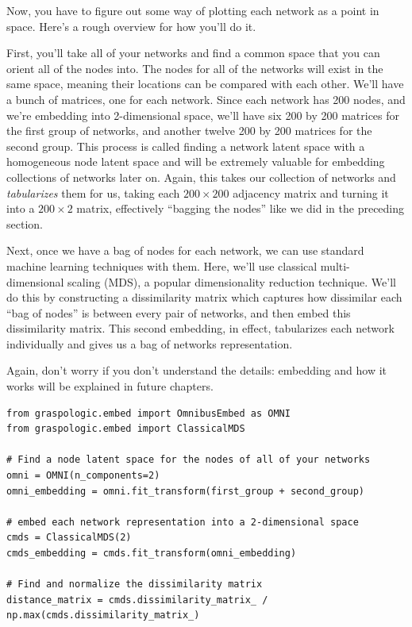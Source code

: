 Now, you have to figure out some way of plotting each network as a point in space. Here's a rough overview for how you'll do it.

First, you'll take all of your networks and find a common space that you can orient all of the nodes into. The nodes for all of the networks will exist in the same space, meaning their locations can be compared with each other. We'll have a bunch of matrices, one for each network. Since each network has 200 nodes, and we're embedding into 2-dimensional space, we'll have six 200 by 200 matrices for the first group of networks, and another twelve 200 by 200 matrices for the second group. This process is called finding a {network} latent space with a homogeneous {node latent space}  and will be extremely valuable for embedding collections of networks later on. Again, this takes our collection of networks and \textit{tabularizes} them for us, taking each $200 \times 200$ adjacency matrix and turning it into a $200 \times 2$ matrix, effectively ``bagging the nodes'' like we did in the preceding section.

Next, once we have a bag of nodes for each network, we can use standard machine learning techniques with them. Here, we'll use classical multi-dimensional scaling (MDS), a popular dimensionality reduction technique. We'll do this by constructing a dissimilarity matrix which captures how dissimilar each ``bag of nodes'' is between every pair of networks, and then embed this dissimilarity matrix. This second embedding, in effect, tabularizes each network individually and gives us a bag of networks representation.

Again, don't worry if you don't understand the details: embedding and how it works will be explained in future chapters.

\begin{lstlisting}[style=python]
from graspologic.embed import OmnibusEmbed as OMNI
from graspologic.embed import ClassicalMDS

# Find a node latent space for the nodes of all of your networks
omni = OMNI(n_components=2)
omni_embedding = omni.fit_transform(first_group + second_group)

# embed each network representation into a 2-dimensional space
cmds = ClassicalMDS(2)
cmds_embedding = cmds.fit_transform(omni_embedding)

# Find and normalize the dissimilarity matrix
distance_matrix = cmds.dissimilarity_matrix_ / np.max(cmds.dissimilarity_matrix_)
\end{lstlisting}

